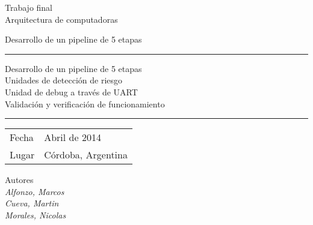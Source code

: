 \thispagestyle{empty}
{\Huge \noindent Trabajo final\\ Arquitectura de computadoras}

\vspace{1cm}

{\Large \noindent Desarrollo de un pipeline de 5 etapas}
                  
\vspace{5cm}
\hrule                  
\vspace{0.2cm}
{\noindent Desarrollo de un pipeline de 5 etapas\bigskip
\\Unidades de detecci\'on de riesgo\bigskip
\\Unidad de debug a trav\'es de UART\bigskip
\\Validaci\'on y verificaci\'on de funcionamiento}
\vspace{0.2cm}
\hrule 


\vfill
\Large
\begin{center}
  \begin{tabular}{| p{5cm} | p{7cm} |}
    \hline
    Fecha                  & Abril de 2014\\
    Lugar                  & Córdoba, Argentina\\  
    \hline    
    \end{tabular}
\end{center}

\bigskip
	Autores\\
    \textit{Alfonzo, Marcos}\\
    \textit{Cueva, Martin}\\	
    \textit{Morales, Nicolas}

\newpage

